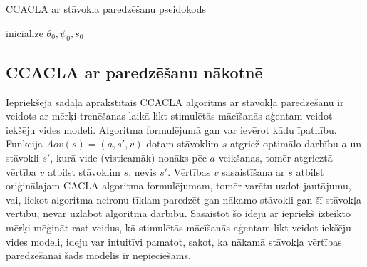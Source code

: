 \documentclass{ludis} %
\begin{document}
\begin{spacing}{1}
\begin{algorithm}
\caption{CCACLA ar stāvokļa paredzēšanu pseidokods}\label{alg:ccacla-state}
inicializē $\theta_0, \psi_0, s_0$ \\
\end{algorithm}
\end{spacing}

\subsection{CCACLA ar paredzēšanu nākotnē}
Iepriekšējā sadaļā aprakstītais CCACLA algoritms ar stāvokļa paredzēšānu ir
veidots ar mērķi trenēšanas laikā likt stimulētās mācīšanās aģentam veidot
iekšēju vides modeli. Algoritma formulējumā gan var ievērot kādu īpatnību.
Funkcija $Aov(s) = (a, s', v)$ dotam stāvoklim $s$ atgriež optimālo darbību $a$
un stāvokli $s'$, kurā vide (visticamāk) nonāks pēc $a$ veikšanas, tomēr
atgrieztā vērtība $v$ atbilst stāvoklim $s$, nevis $s'$. Vērtības $v$
sasaistīšana ar $s$ atbilst oriģinālajam CACLA algoritma formulējumam, tomēr
varētu uzdot jautājumu, vai, liekot algoritma neironu tīklam paredzēt gan nākamo
stāvokli gan šī stāvokļa vērtību, nevar uzlabot algoritma darbību. Sasaistot šo
ideju ar iepriekš izteikto mērķi mēģināt rast veidus, kā stimulētās mācīšanās
aģentam likt veidot iekšēju vides modeli, ideju var intuitīvi pamatot, sakot, ka
nākamā stāvokļa vērtības paredzēšanai šāds modelis ir nepieciešams.
\end{document}
